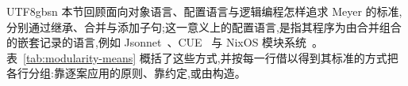 \begin{CJK*}{UTF8}{gbsn}
\ifPaperChinese
本节回顾面向对象语言、配置语言与逻辑编程怎样追求 Meyer 的标准,分别通过继承、合并与添加子句;这一意义上的配置语言,是指其程序为由合并组合的嵌套记录的语言,例如 Jsonnet~\cite{cunningham2014-jsonnet}、CUE~\cite{van-lohuizen2019-cue} 与 NixOS 模块系统~\cite{nixos-contributors-nixos-modules}。表~\ref{tab:modularity-means} 概括了这些方式,并按每一行借以得到其标准的方式把各行分组:靠逐案应用的原则、靠约定,或由构造。

\end{CJK*}

